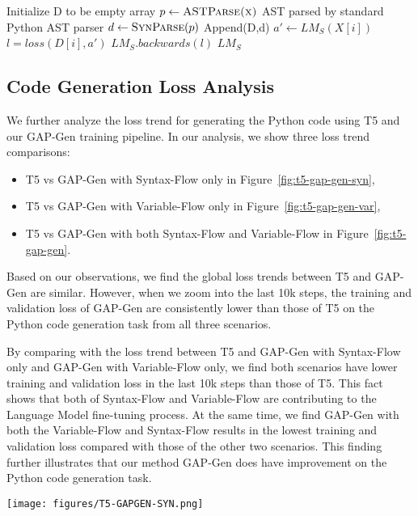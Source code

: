 \documentclass[11pt]{article}
\begin{document}
\begin{algorithm}[ht!]
\caption{Fine-tuning Language Model with Syntax-Flow}\label{alg:wordy}
\begin{algorithmic}[1]
 \State Initialize D to be empty array
  \State $p \gets \textproc{ASTParse(x)}$ AST parsed by standard Python AST parser
  \State $d \gets \textproc{SynParse}(p)$
  \State Append(D,d)
 \EndFor
  \State $a' \gets LM_S(X[i])$ 
  \State $l = loss(D[i],a')$
  \State $LM_S.backwards(l)$
 \EndFor
\State \Return $LM_S$
\end{algorithmic}
\end{algorithm}

\subsection{Code Generation Loss Analysis}
We further analyze the loss trend for generating the Python code using T5 and our GAP-Gen training pipeline. In our analysis, we show three loss trend comparisons: 
\begin{itemize}
    \item T5 vs GAP-Gen with Syntax-Flow only in Figure~\ref{fig:t5-gap-gen-syn},
    \item T5 vs GAP-Gen with Variable-Flow only in Figure~\ref{fig:t5-gap-gen-var},
    \item T5 vs GAP-Gen with both Syntax-Flow and Variable-Flow in Figure~\ref{fig:t5-gap-gen}.
\end{itemize}

Based on our observations, we find the global loss trends between T5 and GAP-Gen are similar. However, when we zoom into the last 10k steps, the training and validation loss of GAP-Gen are consistently lower than those of T5 on the Python code generation task from all three scenarios. 

By comparing with the loss trend between T5 and GAP-Gen with Syntax-Flow only and GAP-Gen with Variable-Flow only, we find both scenarios have lower training and validation loss in the last 10k steps than those of T5. This fact shows that both of Syntax-Flow and Variable-Flow are contributing to the Language Model fine-tuning process. At the same time, we find GAP-Gen with both the Variable-Flow and Syntax-Flow results in the lowest training and validation loss compared with those of the other two scenarios. This finding further illustrates that our method GAP-Gen does have improvement on the Python code generation task. 
\begin{figure*}[ht] 
\centering
\texttt{[image: figures/T5-GAPGEN-SYN.png]}
\vspace{-10pt}
\caption{Loss comparison visualization between T5 and GAP-Gen using Syntax-Flow only.}
\label{fig:t5-gap-gen-syn}
\end{figure*}
\end{document}
